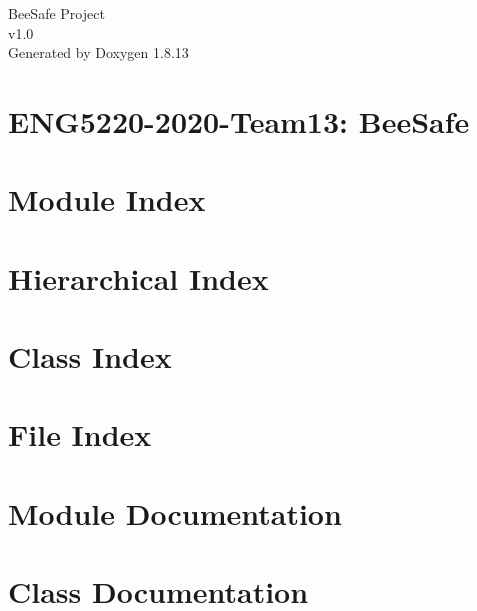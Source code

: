 \documentclass[twoside]{book}
\newcommand{\+}{\discretionary{\mbox{\scriptsize$\hookleftarrow$}}{}{}}
\newcommand{\clearemptydoublepage}{%
  \newpage{\pagestyle{empty}\cleardoublepage}%
}
\begin{document}
\hypersetup{pageanchor=false,
             bookmarksnumbered=true,
             pdfencoding=unicode
            }
\begin{titlepage}
\vspace*{7cm}
\begin{center}%
{\Large Bee\+Safe Project \\[1ex]\large v1.\+0 }\\
\vspace*{1cm}
{\large Generated by Doxygen 1.8.13}\\
\end{center}
\end{titlepage}
\clearemptydoublepage
{}
\tableofcontents
\clearemptydoublepage
{}
\hypersetup{pageanchor=true}

\chapter{E\+N\+G5220-\/2020-\/\+Team13\+: Bee\+Safe}
\label{index}\hypertarget{index}{}
\chapter{Module Index}

\chapter{Hierarchical Index}

\chapter{Class Index}

\chapter{File Index}

\chapter{Module Documentation}






\chapter{Class Documentation}














\end{document}
